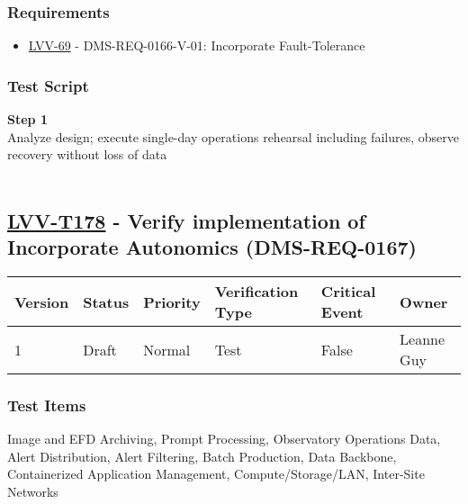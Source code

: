 \hypertarget{requirements-154}{%
\subsubsection{Requirements}\label{requirements-154}}

\begin{itemize}
\tightlist
\item
  \href{https://jira.lsstcorp.org/browse/LVV-69}{LVV-69} -
  DMS-REQ-0166-V-01: Incorporate Fault-Tolerance
\end{itemize}

\hypertarget{test-script-154}{%
\subsubsection{Test Script}\label{test-script-154}}

\textbf{Step 1}\\
Analyze design; execute single-day operations rehearsal including
failures, observe recovery without loss of data\\
~\\

\hypertarget{lvv-t178---verify-implementation-of-incorporate-autonomics-dms-req-0167}{%
\subsection{\texorpdfstring{\href{https://jira.lsstcorp.org/secure/Tests.jspa\#/testCase/LVV-T178}{LVV-T178}
- Verify implementation of Incorporate Autonomics
(DMS-REQ-0167)}{LVV-T178 - Verify implementation of Incorporate Autonomics (DMS-REQ-0167)}}\label{lvv-t178---verify-implementation-of-incorporate-autonomics-dms-req-0167}}

\begin{longtable}[]{@{}llllll@{}}
\toprule
Version & Status & Priority & Verification Type & Critical Event &
Owner\tabularnewline
\midrule
\endhead
1 & Draft & Normal & Test & False & Leanne Guy\tabularnewline
\bottomrule
\end{longtable}

\hypertarget{test-items-154}{%
\subsubsection{Test Items}\label{test-items-154}}

Image and EFD Archiving, Prompt Processing, Observatory Operations Data,
Alert Distribution, Alert Filtering, Batch Production, Data Backbone,
Containerized Application Management, Compute/Storage/LAN, Inter-Site
Networks

